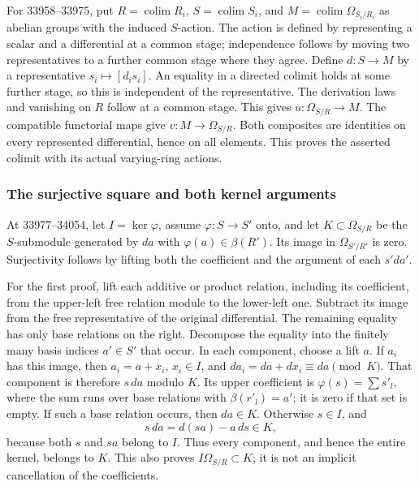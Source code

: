 For 33958--33975, put \(R=\operatorname{colim}R_i\), \(S=\operatorname{colim}S_i\), and \(M=\operatorname{colim}\Omega_{S_i/R_i}\) as abelian groups with the induced \(S\)-action. The action is defined by representing a scalar and a differential at a common stage; independence follows by moving two representatives to a further common stage where they agree. Define \(d:S\to M\) by a representative \(s_i\mapsto[d_i s_i]\). An equality in a directed colimit holds at some further stage, so this is independent of the representative. The derivation laws and vanishing on \(R\) follow at a common stage. This gives \(u:\Omega_{S/R}\to M\). The compatible functorial maps give \(v:M\to\Omega_{S/R}\). Both composites are identities on every represented differential, hence on all elements. This proves the asserted colimit with its actual varying-ring actions.

\subsubsection{The surjective square and both kernel arguments}\label{algebra-proof-041-the-surjective-square-and-both-kernel-arguments}

At 33977--34054, let \(I=\ker\varphi\), assume \(\varphi:S\to S'\) onto, and let \(K\subset\Omega_{S/R}\) be the \(S\)-submodule generated by \(da\) with \(\varphi(a)\in\beta(R')\). Its image in \(\Omega_{S'/R'}\) is zero. Surjectivity follows by lifting both the coefficient and the argument of each \(s'da'\).

For the first proof, lift each additive or product relation, including its coefficient, from the upper-left free relation module to the lower-left one. Subtract its image from the free representative of the original differential. The remaining equality has only base relations on the right. Decompose the equality into the finitely many basis indices \(a'\in S'\) that occur. In each component, choose a lift \(a\). If \(a_i\) has this image, then \(a_i=a+x_i\), \(x_i\in I\), and \(da_i=da+dx_i\equiv da\pmod K\). That component is therefore \(s\,da\) modulo \(K\). Its upper coefficient is \(\varphi(s)=\sum s'_l\), where the sum runs over base relations with \(\beta(r'_l)=a'\); it is zero if that set is empty. If such a base relation occurs, then \(da\in K\). Otherwise \(s\in I\), and \[
s\,da=d(sa)-a\,ds\in K,
\] because both \(s\) and \(sa\) belong to \(I\). Thus every component, and hence the entire kernel, belongs to \(K\). This also proves \(I\Omega_{S/R}\subset K\); it is not an implicit cancellation of the coefficients.

